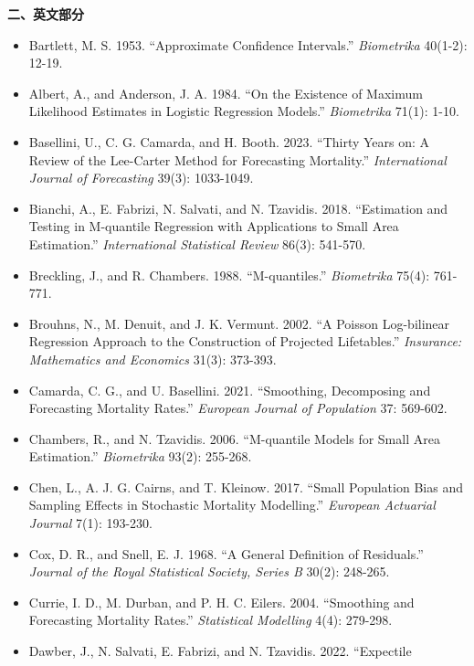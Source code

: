 \documentclass[UTF8, fontset=macnew, a4paper, 12pt]{ctexart}
\begin{document}
\vspace{6pt}
\noindent\textbf{二、英文部分}
\begin{itemize}[leftmargin=2em, itemsep=2pt, parsep=0pt]
  \item[] Bartlett, M. S. 1953. ``Approximate Confidence Intervals.''
        \textit{Biometrika} 40(1-2): 12-19.
  \item[] Albert, A., and Anderson, J. A. 1984. ``On the Existence of Maximum
        Likelihood Estimates in Logistic Regression Models.''
        \textit{Biometrika} 71(1): 1-10.
  \item[] Basellini, U., C. G. Camarda, and H. Booth. 2023. ``Thirty Years on:
        A Review of the Lee-Carter Method for Forecasting Mortality.''
        \textit{International Journal of Forecasting} 39(3): 1033-1049.
  \item[] Bianchi, A., E. Fabrizi, N. Salvati, and N. Tzavidis. 2018.
        ``Estimation and Testing in M-quantile Regression with Applications to
        Small Area Estimation.'' \textit{International Statistical Review}
        86(3): 541-570.
  \item[] Breckling, J., and R. Chambers. 1988. ``M-quantiles.''
        \textit{Biometrika} 75(4): 761-771.
  \item[] Brouhns, N., M. Denuit, and J. K. Vermunt. 2002. ``A Poisson
        Log-bilinear Regression Approach to the Construction of Projected
        Lifetables.'' \textit{Insurance: Mathematics and Economics} 31(3): 373-393.
  \item[] Camarda, C. G., and U. Basellini. 2021. ``Smoothing, Decomposing and
        Forecasting Mortality Rates.'' \textit{European Journal of Population}
        37: 569-602.
  \item[] Chambers, R., and N. Tzavidis. 2006. ``M-quantile Models for Small
        Area Estimation.'' \textit{Biometrika} 93(2): 255-268.
  \item[] Chen, L., A. J. G. Cairns, and T. Kleinow. 2017. ``Small Population
        Bias and Sampling Effects in Stochastic Mortality Modelling.''
        \textit{European Actuarial Journal} 7(1): 193-230.
  \item[] Cox, D. R., and Snell, E. J. 1968. ``A General Definition of Residuals.''
        \textit{Journal of the Royal Statistical Society, Series B} 30(2): 248-265.
  \item[] Currie, I. D., M. Durban, and P. H. C. Eilers. 2004. ``Smoothing and
        Forecasting Mortality Rates.'' \textit{Statistical Modelling} 4(4): 279-298.
  \item[] Dawber, J., N. Salvati, E. Fabrizi, and N. Tzavidis. 2022. ``Expectile

\end{itemize}
\end{document}
